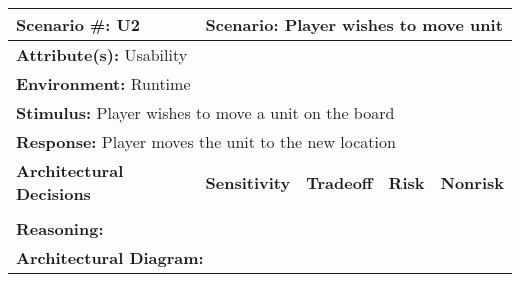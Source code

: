 \begin{tabular}{|m{}|m{}|m{}
|m{}|m{}|m{}|}
  \hline
  {\bf Scenario \#:} U2 & \multicolumn{5}{m{0.75 \textwidth}|}{{\bf Scenario:}
  Player wishes to move unit} \\ \hline
  \multicolumn{6}{|m{0.9 \textwidth}|}{{\bf Attribute(s):} Usability} \\ \hline
  \multicolumn{6}{|m{0.9 \textwidth}|}{{\bf Environment:} Runtime} \\ \hline
  \multicolumn{6}{|m{0.9 \textwidth}|}{{\bf Stimulus:} Player wishes to move a
  unit on the board} \\ \hline
  \multicolumn{6}{|m{0.9 \textwidth}|}{{\bf Response:} Player moves the unit to
  the new location} \\ \hline
  \multicolumn{2}{|m{0.3 \textwidth}|}{\bf Architectural Decisions} &
  {\bf Sensitivity} & {\bf Tradeoff} & {\bf Risk} & {\bf Nonrisk} \\ \hline
  \multicolumn{2}{|m{0.3 \textwidth}|}{} &  &  &  &  \\ \hline
  \multicolumn{6}{|m{0.9 \textwidth}|}{{\bf Reasoning:} } \\ \hline
  \multicolumn{6}{|m{0.9 \textwidth}|}{{\bf Architectural Diagram:} } \\ \hline
\end{tabular}
